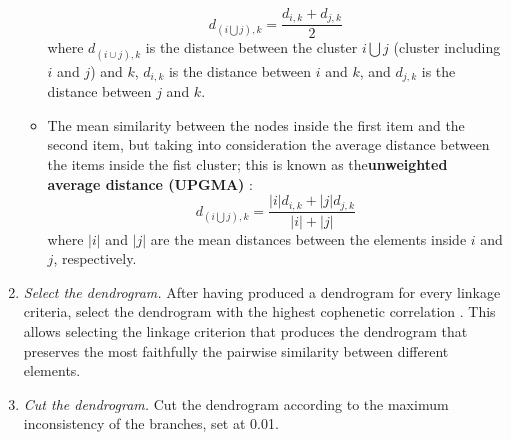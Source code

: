 \documentclass[twocolumn]{article}
\begin{document}
\begin{appendices}
\begin{enumerate}
\begin{itemize}
				            \begin{equation}
					            d_{(i \bigcup j),k}=\frac{d_{i,k}+d_{j,k}}{2} \label{eqn:WPGMA}
				            \end{equation}
	            where $d_{\left(i\cup j\right),k}$ is the distance between the cluster $i \bigcup j$ (cluster including $i$ and $j$) and $k$, $d_{i,k}$ is the distance between $i$ and $k$, and  $d_{j,k}$ is the distance between $j$ and $k$.
				      \item	The mean similarity between the nodes inside the first item and the second item, but taking into consideration the average distance between the items inside the fist cluster;
				            this is known as the\textbf{unweighted average distance (UPGMA)} \citep{Sokal1958}:
				            \begin{equation}
					            d_{(i \bigcup j),k}=\frac{|i|d_{i,k}+|j|d_{j,k}}{|i|+|j|} \label{eqn:UPGMA}
				            \end{equation}
										where $|i|$ and $|j|$ are the mean distances between the elements inside $i$ and $j$, respectively.
			      \end{itemize}
			\item \emph{Select the dendrogram.} \smallskip \newline
						After having produced a dendrogram for every linkage criteria, select the dendrogram with the highest cophenetic correlation \citep{Sokal1962}.
			      This allows selecting the linkage criterion that produces the dendrogram that preserves the most faithfully the pairwise similarity between different elements.
			\item \emph{Cut the dendrogram.} \smallskip \newline
			      Cut the dendrogram according to the maximum inconsistency of the branches, set at 0.01.
		\end{enumerate}

\end{appendices}
\end{document}
